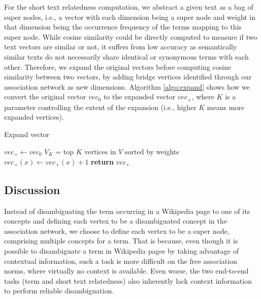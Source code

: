 For the short text relatedness computation, 
we abstract a given text as a bag of super nodes, i.e., a vector with each
dimension being a super node and weight in that dimension being
the occurrence frequency of the terms mapping to this super node. While
cosine similarity could be directly computed to measure if two text
vectors are similar or not, it suffers from low accuracy as
semantically similar texts do not necessarily share identical or
synonymous terms with each other. 
Therefore, we expand
the original vectors before computing cosine similarity between two
vectors, by adding bridge vertices identified through our
association network as new dimensions. Algorithm \ref{algo:expand}
shows how we convert the original vector $vec_0$ to the expanded
vector $vec_+$, where $K$ is a parameter controlling the extent of 
the expansion (i.e., higher $K$ means more expanded vertices).

\begin{algorithm}[th]
\caption{Expand vector}
\label{algo:expand}
\begin{algorithmic}[1]
\State $vec_+ \leftarrow vec_0$
\State $V_K$ = top $K$ vertices in $V$ sorted by weights
\State $vec_+(x) \leftarrow vec_+(x) + 1$
\EndFor
\EndFor
\State \textbf{return} $vec_+$
\EndFunction
\end{algorithmic}
\end{algorithm}


\subsection{Discussion}
\label{sec:discussion}

%
Instead of disambiguating the term occurring in a Wikipedia page to
one of its concepts and defining each vertex to be a disambiguated
concept in the association network, we choose to define each vertex
to be a super node, comprising multiple concepts for a term.
That is because, even though it is possible to disambiguate a term
in Wikipedia pages by taking advantage of contextual information,
such a task is more difficult on the free association norms, where
virtually no context is available. Even worse, the two end-to-end
tasks (term and short text relatedness) also
inherently lack context information to perform reliable
disambiguation.

